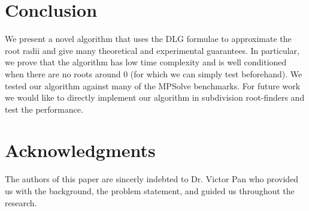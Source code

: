 \documentclass[runningheads]{llncs}
\begin{document}
\section{Conclusion}
We present a novel algorithm that uses the DLG formulae to approximate the root radii and give many theoretical and experimental guarantees. In particular, we prove that the algorithm has low time complexity and is well conditioned when there are no roots around 0 (for which we can simply test beforehand). We tested our algorithm against many of the MPSolve benchmarks. For future work we would like to directly implement our algorithm in subdivision root-finders and test the performance.

\section{Acknowledgments}
The authors of this paper are sincerly indebted to Dr. Victor Pan who provided us with the background, the problem statement, and guided us throughout the research.




\appendix
\end{document}
